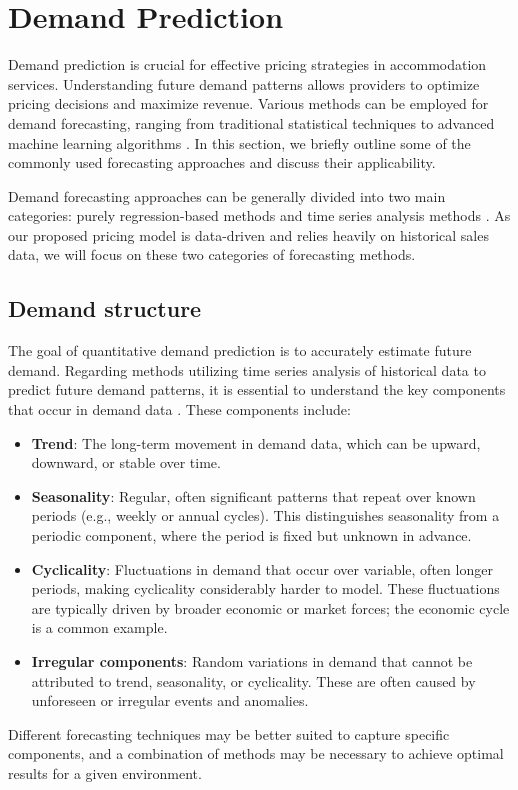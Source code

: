 \section{Demand Prediction}
Demand prediction is crucial for effective pricing strategies in accommodation services. Understanding future demand patterns allows providers to optimize pricing decisions and maximize revenue. Various methods can be employed for demand forecasting, ranging from traditional statistical techniques to advanced machine learning algorithms \cite{Ampountolas2024}. In this section, we briefly outline some of the commonly used forecasting approaches and discuss their applicability.

Demand forecasting approaches can be generally divided into two main categories: purely regression-based methods and time series analysis methods \cite{Petricek2021}. As our proposed pricing model is data-driven and relies heavily on historical sales data, we will focus on these two categories of forecasting methods.


\subsection{Demand structure}
The goal of quantitative demand prediction is to accurately estimate future demand. Regarding methods utilizing time series analysis of historical data to predict future demand patterns, it is essential to understand the key components that occur in demand data \cite{Petricek2021}. These components include:
\begin{itemize}
    \item \textbf{Trend}: The long-term movement in demand data, which can be upward, downward, or stable over time.
    \item \textbf{Seasonality}: Regular, often significant patterns that repeat over known periods (e.g., weekly or annual cycles). This distinguishes seasonality from a periodic component, where the period is fixed but unknown in advance.
    \item \textbf{Cyclicality}: Fluctuations in demand that occur over variable, often longer periods, making cyclicality considerably harder to model. These fluctuations are typically driven by broader economic or market forces; the economic cycle is a common example.
    \item \textbf{Irregular components}: Random variations in demand that cannot be attributed to trend, seasonality, or cyclicality. These are often caused by unforeseen or irregular events and anomalies.
\end{itemize}
Different forecasting techniques may be better suited to capture specific components, and a combination of methods may be necessary to achieve optimal results for a given environment.

